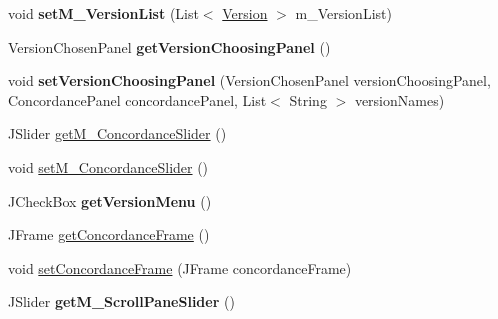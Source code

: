 \begin{DoxyCompactItemize}
void {\bfseries set\+M\+\_\+\+Version\+List} (List$<$ \hyperlink{classtranslation_visualization_1_1_version}{Version} $>$ m\+\_\+\+Version\+List)
\item 
\mbox{\label{classtranslation_visualization_1_1_translation_visualization_abf2f9df3311824d335af190a768116ab}} 
Version\+Chosen\+Panel {\bfseries get\+Version\+Choosing\+Panel} ()
\item 
\mbox{\label{classtranslation_visualization_1_1_translation_visualization_a7b4145b39f3594fad08b245cb020b472}} 
void {\bfseries set\+Version\+Choosing\+Panel} (Version\+Chosen\+Panel version\+Choosing\+Panel, Concordance\+Panel concordance\+Panel, List$<$ String $>$ version\+Names)
\item 
J\+Slider \hyperlink{classtranslation_visualization_1_1_translation_visualization_acfa61dfbe046b9340c09b24408002092}{get\+M\+\_\+\+Concordance\+Slider} ()
\item 
void \hyperlink{classtranslation_visualization_1_1_translation_visualization_a1f8a8214bc3e3d76cf4add08e9f49f54}{set\+M\+\_\+\+Concordance\+Slider} ()
\item 
\mbox{\label{classtranslation_visualization_1_1_translation_visualization_ae6025a07cb2a10acdc21d6414e37475e}} 
J\+Check\+Box {\bfseries get\+Version\+Menu} ()
\item 
J\+Frame \hyperlink{classtranslation_visualization_1_1_translation_visualization_a1d0a60810eb6d9d8dfae70e6f254d519}{get\+Concordance\+Frame} ()
\item 
void \hyperlink{classtranslation_visualization_1_1_translation_visualization_acfd9146c7e934d5788d4dabe0236dd4f}{set\+Concordance\+Frame} (J\+Frame concordance\+Frame)
\item 
\mbox{\label{classtranslation_visualization_1_1_translation_visualization_a61655ae18bec032043b797a07f27e410}} 
J\+Slider {\bfseries get\+M\+\_\+\+Scroll\+Pane\+Slider} ()
\item 
\mbox{\label{classtranslation_visualization_1_1_translation_visualization_ae56a89032dbfa85afda7cb839b0f08aa}} 

\end{DoxyCompactItemize}
